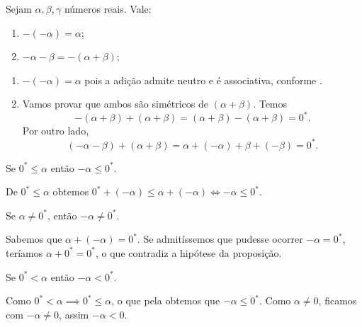 \documentclass[../main.tex]{subfiles}
\begin{document}
\begin{prop}\label{reais-prop-regraSinais}
    Sejam $\alpha, \beta, \gamma$ números reais. Vale:
    \begin{enumerate}[label=(\roman*)]
        \item $-(-\alpha) = \alpha$;
        \item $-\alpha - \beta = -(\alpha + \beta)$;
    \end{enumerate}
\end{prop}

\begin{dem}
    \begin{enumerate}[label=(\roman*)]
        \item $-(-\alpha) = \alpha$ pois a adição admite neutro e é associativa, conforme . 
        \item Vamos provar que ambos são simétricos de $(\alpha + \beta)$. Temos 
        \[ -(\alpha + \beta) + (\alpha + \beta) = (\alpha + \beta) - (\alpha + \beta) = 0^*. \] Por outro lado, \[ (-\alpha - \beta) + (\alpha + \beta) = \alpha + (- \alpha) + \beta +(- \beta) = 0^*. \]
    \end{enumerate}    
\end{dem}

\begin{prop}\label{reais-prop-negativo}
    Se $0^* \leq \alpha$ então $-\alpha \leq 0^*$.
\end{prop}
\begin{dem}
    De $0^* \leq \alpha$ obtemos $0^* + (-\alpha) \leq \alpha + (-\alpha) \iff -\alpha \leq 0^*$.
\end{dem}
\begin{prop}
    Se $\alpha \neq 0^*$, então $-\alpha \neq 0^*$.
\end{prop}
\begin{dem}
    Sabemos que $\alpha + (-\alpha) = 0^*$. Se admitíssemos que pudesse ocorrer $-\alpha = 0^*$, teríamos $\alpha + 0^* = 0^*$, o que contradiz a hipótese da proposição. 
\end{dem}
\begin{corol}
    Se $0^* < \alpha$ então $-\alpha < 0^*$.
\end{corol}
\begin{dem}
    Como $0^* < \alpha \implies 0^* \leq \alpha$, o que pela  obtemos que $-\alpha \leq 0^*$. Como $\alpha \neq 0$, ficamos com $-\alpha \neq 0$, assim $-\alpha < 0$.
\end{dem}
\end{document}
